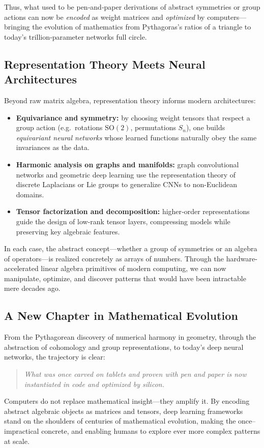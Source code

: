 Thus, what used to be pen‐and‐paper derivations of abstract symmetries or group actions can now be \emph{encoded} as weight matrices and \emph{optimized} by computers—bringing the evolution of mathematics from Pythagoras’s ratios of a triangle to today’s trillion‐parameter networks full circle.





\subsection{Representation Theory Meets Neural Architectures}
Beyond raw matrix algebra, representation theory informs modern architectures:
\begin{itemize}
  \item \textbf{Equivariance and symmetry:} by choosing weight tensors that respect a group action (e.g.\ rotations \(\mathrm{SO}(2)\), permutations \(S_n\)), one builds \emph{equivariant neural networks} whose learned functions naturally obey the same invariances as the data.
  \item \textbf{Harmonic analysis on graphs and manifolds:} graph convolutional networks and geometric deep learning use the representation theory of discrete Laplacians or Lie groups to generalize CNNs to non-Euclidean domains.
  \item \textbf{Tensor factorization and decomposition:} higher‐order representations guide the design of low-rank tensor layers, compressing models while preserving key algebraic features.
\end{itemize}

In each case, the abstract concept—whether a group of symmetries or an algebra of operators—is realized concretely as arrays of numbers.  Through the hardware‐accelerated linear algebra primitives of modern computing, we can now manipulate, optimize, and discover patterns that would have been intractable mere decades ago.





\subsection{A New Chapter in Mathematical Evolution}
From the Pythagorean discovery of numerical harmony in geometry, through the abstraction of cohomology and group representations, to today’s deep neural networks, the trajectory is clear:

\begin{quote}
\textit{What was once carved on tablets and proven with pen and paper is now instantiated in code and optimized by silicon.}
\end{quote}

Computers do not replace mathematical insight—they amplify it.  By encoding abstract algebraic objects as matrices and tensors, deep learning frameworks stand on the shoulders of centuries of mathematical evolution, making the once–impractical concrete, and enabling humans to explore ever more complex patterns at scale.

